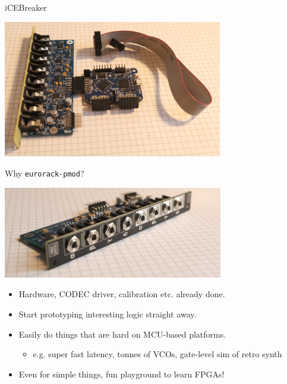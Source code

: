 \documentclass[aspectratio=169]{beamer}
\begin{document}
\begin{frame}{iCEBreaker}

\begin{center}
    \includegraphics[height=6cm]{img/icebreaker.png}
\end{center}

\end{frame}



\begin{frame}{Why \texttt{eurorack-pmod}?}

    \begin{center}
        \includegraphics[height=4cm]{img/frontconndof.png}
    \end{center}

    \begin{itemize}
        \item Hardware, CODEC driver, calibration etc. already done.
        \item Start prototyping interesting logic straight away.
        \item Easily do things that are hard on MCU-based platforms.
            \begin{itemize}
                \item e.g. super fast latency, tonnes of VCOs, gate-level sim of retro synth
            \end{itemize}
        \item Even for simple things, fun playground to learn FPGAs!
    \end{itemize}

\end{frame}
\end{document}
